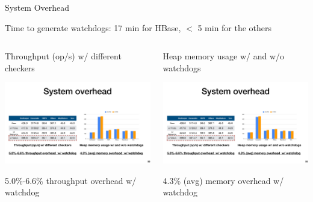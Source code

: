 \documentclass[aspectratio=169]{beamer}
\begin{document}
\begin{frame}{System Overhead}
    \begin{block}{}
        Time to generate watchdogs: 17 min for HBase, $<$ 5 min for the others
    \end{block}
    \begin{columns}
        \begin{column}{.5\textwidth}
            Throughput (op/s) w/ different checkers
            \vspace{1em}
            \begin{center}
                \includegraphics[width=\textwidth]{fig/throughput}

            \end{center}
            \vspace{1em}
            \begin{block}{}
                5.0\%-6.6\% throughput overhead  w/ watchdog
            \end{block}
        \end{column}

        \begin{column}{.55\textwidth}
            Heap memory usage w/ and w/o watchdogs
            \begin{center}
                \includegraphics[width=\textwidth]{fig/heap}
            \end{center}
            \begin{block}{}
                4.3\% (avg) memory overhead  w/ watchdog
            \end{block}
        \end{column}
    \end{columns}
\end{frame}
\end{document}
